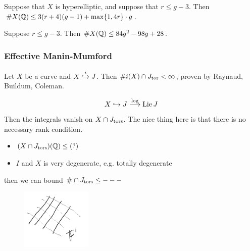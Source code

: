 \begin{thm}[Stoll]
Suppose that $X$ is hyperelliptic, and suppose that $r \leq g-3$. Then $\#X(\mathbb{Q}) \leq 3(r+4)(g-1) + \max\{1,4r\} \cdot g$.
\end{thm}


\begin{thm}
Suppose $r \leq g-3$. Then $\#X(\mathbb{Q}) \leq 84 g^2 - 98g + 28$. 
\end{thm}



\subsubsection{Effective Manin-Mumford}

Let $X$ be a curve and $X \stackrel{i}{\hookrightarrow} J$. Then $\#i(X) \cap J_{\text{tor}} < \infty$, proven by Raynaud, Buildum, Coleman.

	\[
	X \hookrightarrow J \stackrel{\log}{\longrightarrow} \operatorname{Lie} J
	\]
Then the integrals vanish on $X \cap J_{\text{tors}}$. The nice thing here is that there is no necessary rank condition. 


\begin{thm}[KRZB]
\begin{itemize}
\item $(X \cap J_{\text{tors}})(\mathbb{Q}) \leq (?)$
\item $I$ and $X$ is very degenerate, e.g. totally degenerate
\end{itemize}
then we can bound $\# \cap J_{\text{tors}} \leq ---$
\end{thm}


	\begin{figure}[!ht]
	\centering
	\includegraphics[width=0.3\textwidth]{../images/im2.png}
	\end{figure}
	
	
